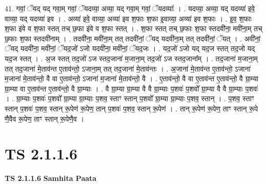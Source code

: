 \documentclass[17pt]{extarticle}
\begin{document}
41. गवां॒ ॅयद् यद् गवा॒म् गवां॒ ॅयदव्या॒ अव्या॒ यद् गवा॒म् गवां॒ ॅयदव्याः᳚ । . यदव्या॒ अव्या॒ यद् यदव्या॑ इवे॒ वाव्या॒ यद् यदव्या॑ इव । . अव्या॑ इवे॒ वाव्या॒ अव्या॑ इव श॒फाः श॒फा इ॒वाव्या॒ अव्या॑ इव श॒फाः । . इ॒व॒ श॒फाः श॒फा इ॑वे व श॒फा स्तत् तच् छ॒फा इ॑वे व श॒फा स्तत् । . श॒फा स्तत् तच् छ॒फाः श॒फा स्तदवी॑ना॒ मवी॑ना॒म् तच् छ॒फाः श॒फा स्तदवी॑नाम् । . तदवी॑ना॒ मवी॑ना॒म् तत् तदवी॑नां॒ ॅयद् यदवी॑ना॒म् तत् तदवी॑नां॒ ॅयत् । . अवी॑नां॒ ॅयद् यदवी॑ना॒ मवी॑नां॒ ॅयद॒जो॑ ऽजो यदवी॑ना॒ मवी॑नां॒ ॅयद॒जः । . यद॒जो॑ ऽजो यद् यद॒ज स्तत् तद॒जो यद् यद॒ज स्तत् । . अ॒ज स्तत् तद॒जो॑ ऽज स्तद॒जाना॑ म॒जाना॒म् तद॒जो॑ ऽज स्तद॒जाना᳚म् । . तद॒जाना॑ म॒जाना॒म् तत् तद॒जाना॑ मे॒ताव॑न्त ए॒ताव॑न्तो॒ ऽजाना॒म् तत् तद॒जाना॑ मे॒ताव॑न्तः । . अ॒जाना॑ मे॒ताव॑न्त ए॒ताव॑न्तो॒ ऽजाना॑ म॒जाना॑ मे॒ताव॑न्तो॒ वै वा ए॒ताव॑न्तो॒ ऽजाना॑ म॒जाना॑ मे॒ताव॑न्तो॒ वै । . ए॒ताव॑न्तो॒ वै वा ए॒ताव॑न्त ए॒ताव॑न्तो॒ वै ग्रा॒म्या ग्रा॒म्या वा ए॒ताव॑न्त ए॒ताव॑न्तो॒ वै ग्रा॒म्याः । . वै ग्रा॒म्या ग्रा॒म्या वै वै ग्रा॒म्याः प॒शवः॑ प॒शवो᳚ ग्रा॒म्या वै वै ग्रा॒म्याः प॒शवः॑ । . ग्रा॒म्याः प॒शवः॑ प॒शवो᳚ ग्रा॒म्या ग्रा॒म्याः प॒शव॒ स्ताꣳ स्तान् प॒शवो᳚ ग्रा॒म्या ग्रा॒म्याः प॒शव॒ स्तान् । . प॒शव॒ स्ताꣳ स्तान् प॒शवः॑ प॒शव॒ स्तान् रू॒पेण॑ रू॒पेण॒ तान् प॒शवः॑ प॒शव॒ स्तान् रू॒पेण॑ । . तान् रू॒पेण॑ रू॒पेण॒ ताꣳ स्तान् रू॒पे णै॒वैव रू॒पेण॒ ताꣳ स्तान् रू॒पेणै॒व । \newline
\pagebreak
{}
\section*{ TS 2.1.1.6 }

\textbf{TS 2.1.1.6 } \newline
\textbf{Samhita Paata} \newline
\end{document}
